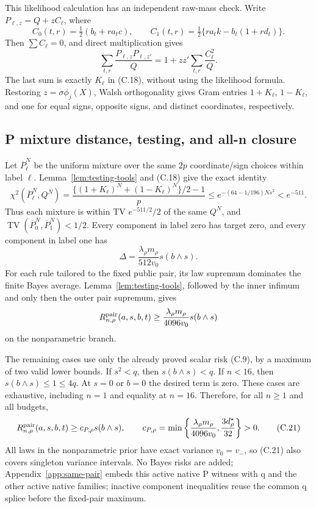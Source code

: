 This likelihood calculation has an independent raw-mass check.  Write
\(P_{\ell,z}=Q+zC_\ell\), where
\[
 C_0(t,r)=\tfrac12(b_t+ra_tc),\qquad
 C_1(t,r)=\tfrac12\{ra_tk-b_t(1+rd_t)\}.
\]
Then \(\sum C_\ell=0\), and direct multiplication gives
\[
 \sum_{t,r}\frac{P_{\ell,z}P_{\ell,z'}}Q
 =1+zz'\sum_{t,r}\frac{C_\ell^2}Q.
 \tag{C.19}
\]
The last sum is exactly \(K_\ell\) in (C.18), without using the likelihood
formula.  Restoring \(z=\sigma\phi_j(X)\), Walsh orthogonality gives Gram
entries \(1+K_\ell\), \(1-K_\ell\), and one for equal signs, opposite signs,
and distinct coordinates, respectively.

\subsection{P mixture distance, testing, and all-n closure}
\label{app:p-testing}

Let \(\overline P_\ell^N\) be the uniform mixture over the same \(2p\)
coordinate/sign choices within label \(\ell\).  Lemma~\ref{lem:testing-tools}
and (C.18) give the exact identity
\[
 \chi^2(\overline P_\ell^N,Q^N)
 =\frac{\{(1+K_\ell)^N+(1-K_\ell)^N\}/2-1}{p}
 \le e^{-(64-1/196)Ns^2}<e^{-511}.
 \tag{C.20}
\]
Thus each mixture is within TV \(e^{-511/2}/2\) of the same \(Q^N\), and
\(\operatorname{TV}(\overline P_0^N,\overline P_1^N)<1/2\).  Every
component in label zero has target zero, and every component in label one
has
\[
 \Delta=\frac{\lambda_\rho m_\rho}{512v_0}s(b\wedge s).
\]
For each rule tailored to the fixed public pair, its law supremum dominates
the finite Bayes average.  Lemma~\ref{lem:testing-tools}, followed by the
inner infimum and only then the outer pair supremum, gives
\[
 R^{\mathrm{pair}}_{n,\rho}(a,s,b,t)\ge
 \frac{\lambda_\rho m_\rho}{4096v_0}s(b\wedge s)
\]
on the nonparametric branch.

The remaining cases use only the already proved scalar risk (C.9), by a
maximum of two valid lower bounds.  If \(s^2<q\), then
\(s(b\wedge s)<q\).  If \(n<16\), then
\(s(b\wedge s)\le1\le4q\).  At \(s=0\) or \(b=0\) the desired term is zero.
These cases are exhaustive, including \(n=1\) and equality at \(n=16\).
Therefore, for all \(n\ge1\) and all budgets,
\begin{equation}
 R^{\mathrm{pair}}_{n,\rho}(a,s,b,t)\ge c_{P,\rho}s(b\wedge s),\qquad
 c_{P,\rho}=
 \min\left\{\frac{\lambda_\rho m_\rho}{4096v_0},
             \frac{3d_\rho^\star}{32}\right\}>0.
 \tag{C.21}
\end{equation}
 All laws in the nonparametric prior have exact variance \(v_0=v_-\), so
 (C.21) also covers singleton variance intervals.  No Bayes risks are added;
 Appendix~\ref{app:same-pair} embeds this active native P witness with q and
 the other active native families; inactive component inequalities reuse the
 common q splice before the fixed-pair maximum.
